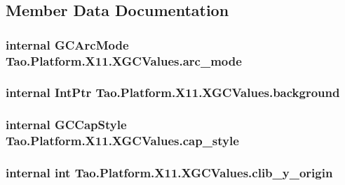 \subsection{Member Data Documentation}
\hypertarget{struct_tao_1_1_platform_1_1_x11_1_1_x_g_c_values_a099190015d7f797ac8ca1460dcc7fe0f}{
\subsubsection[{arc\_\-mode}]{\setlength{\rightskip}{0pt plus 5cm}internal {\bf GCArcMode} {\bf Tao.Platform.X11.XGCValues.arc\_\-mode}}}
\label{struct_tao_1_1_platform_1_1_x11_1_1_x_g_c_values_a099190015d7f797ac8ca1460dcc7fe0f}
\hypertarget{struct_tao_1_1_platform_1_1_x11_1_1_x_g_c_values_adcb5fa9a3528a5ca99a99b4d8386a438}{
\subsubsection[{background}]{\setlength{\rightskip}{0pt plus 5cm}internal IntPtr {\bf Tao.Platform.X11.XGCValues.background}}}
\label{struct_tao_1_1_platform_1_1_x11_1_1_x_g_c_values_adcb5fa9a3528a5ca99a99b4d8386a438}
\hypertarget{struct_tao_1_1_platform_1_1_x11_1_1_x_g_c_values_a3e04a0a163c0a2c6efc5ee17e685f7ee}{
\subsubsection[{cap\_\-style}]{\setlength{\rightskip}{0pt plus 5cm}internal {\bf GCCapStyle} {\bf Tao.Platform.X11.XGCValues.cap\_\-style}}}
\label{struct_tao_1_1_platform_1_1_x11_1_1_x_g_c_values_a3e04a0a163c0a2c6efc5ee17e685f7ee}
\hypertarget{struct_tao_1_1_platform_1_1_x11_1_1_x_g_c_values_a5d42724dc04fb1593c939c231b0d8991}{
\subsubsection[{clib\_\-y\_\-origin}]{\setlength{\rightskip}{0pt plus 5cm}internal int {\bf Tao.Platform.X11.XGCValues.clib\_\-y\_\-origin}}}
